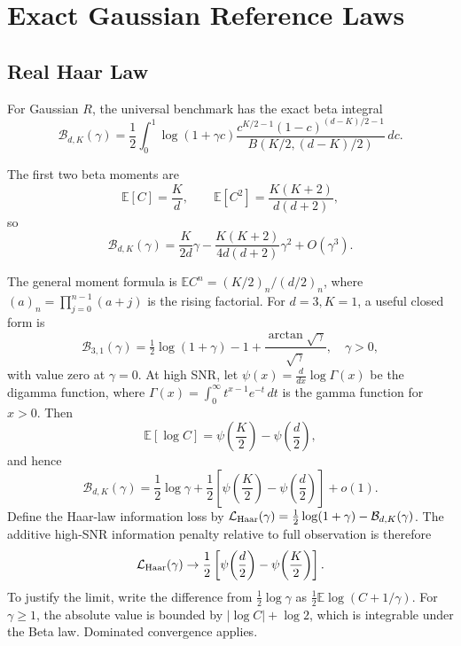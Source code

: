 \documentclass[lettersize,onecolumn]{IEEEtran}
\theoremstyle{remark}
\theoremstyle{definition}
\newcommand{\EE}{\mathbb E}
\newcommand{\Lloss}{\mathcal L}
\newcommand{\Bbase}{\mathcal B}
\begin{document}
\section{Exact Gaussian Reference Laws}

\subsection{Real Haar Law}
For Gaussian $R$, the universal benchmark has the exact beta integral
\begin{equation}
\Bbase_{d,K}(\gamma)
=\frac12\int_0^1
\log(1+\gamma c)
\frac{c^{K/2-1}(1-c)^{(d-K)/2-1}}
{B(K/2,(d-K)/2)}\,dc.
\label{eq:beta_integral}
\end{equation}

The first two beta moments are
\begin{equation}
\EE[C]=\frac Kd,
\qquad
\EE[C^2]=\frac{K(K+2)}{d(d+2)},
\end{equation}
so
\begin{equation}
\Bbase_{d,K}(\gamma)
=\frac{K}{2d}\gamma
-\frac{K(K+2)}{4d(d+2)}\gamma^2
+O(\gamma^3).
\label{eq:haar_low}
\end{equation}

The general moment formula is $\EE C^n=(K/2)_n/(d/2)_n$, where $(a)_n=\prod_{j=0}^{n-1}(a+j)$ is the rising factorial. For $d=3,K=1$, a useful closed form is
\begin{equation}
\Bbase_{3,1}(\gamma)=\tfrac12\log(1+\gamma)-1+\frac{\arctan\sqrt\gamma}{\sqrt\gamma},\quad\gamma>0,
\end{equation}
with value zero at $\gamma=0$. At high SNR, let $\psi(x)=\frac{d}{dx}\log\Gamma(x)$ be the digamma function, where $\Gamma(x)=\int_0^\infty t^{x-1}e^{-t}\,dt$ is the gamma function for $x>0$. Then
\begin{equation}
\EE[\log C]
=\psi\!\left(\frac K2\right)-\psi\!\left(\frac d2\right),
\end{equation}
and hence
\begin{equation}
\Bbase_{d,K}(\gamma)
=\frac12\log\gamma
+\frac12\left[\psi\!\left(\frac K2\right)-\psi\!\left(\frac d2\right)\right]
+o(1).
\label{eq:haar_high}
\end{equation}
Define the Haar-law information loss by
$\Lloss_{\rm Haar}(\gamma)=\tfrac12\log(1+\gamma)-\Bbase_{d,K}(\gamma)$.
The additive high-SNR information penalty relative to full observation is therefore
\begin{equation}
\Lloss_{\rm Haar}(\gamma)\to
\frac12\left[\psi\!\left(\frac d2\right)-\psi\!\left(\frac K2\right)\right].
\label{eq:digamma}
\end{equation}
To justify the limit, write the difference from $\tfrac12\log\gamma$ as $\tfrac12\EE\log(C+1/\gamma)$. For $\gamma\ge1$, the absolute value is bounded by $|\log C|+\log2$, which is integrable under the Beta law. Dominated convergence applies.
\end{document}
